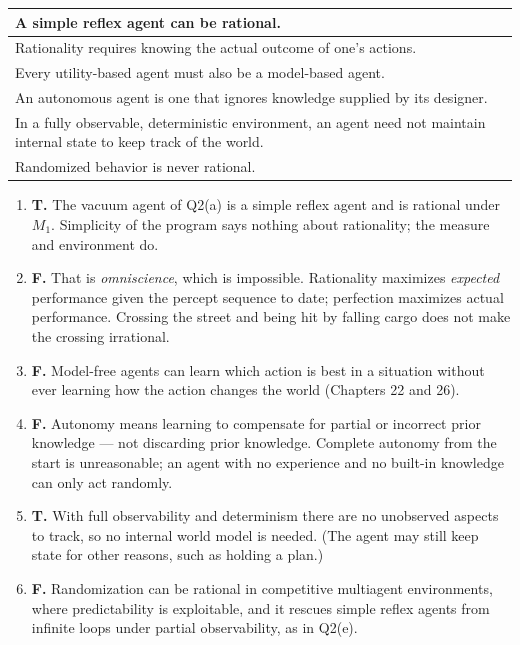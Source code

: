 \begin{center}
\renewcommand{\arraystretch}{1.9}
\begin{tabular}{p{13.2cm}|c}
\toprule
A simple reflex agent can be rational. & \A{T} \\
\hline
Rationality requires knowing the actual outcome of one's actions. & \A{F} \\
\hline
Every utility-based agent must also be a model-based agent. & \A{F} \\
\hline
An autonomous agent is one that ignores knowledge supplied by its designer. & \A{F} \\
\hline
In a fully observable, deterministic environment, an agent need not maintain internal state to keep track of the world. & \A{T} \\
\hline
Randomized behavior is never rational. & \A{F} \\
\bottomrule
\end{tabular}
\end{center}

\begin{sol}
\begin{enumerate}[label=\arabic*.,leftmargin=1.6em]
\item \textbf{T.} The vacuum agent of Q2(a) is a simple reflex agent and is rational under
$M_1$. Simplicity of the program says nothing about rationality; the measure and environment do.
\item \textbf{F.} That is \emph{omniscience}, which is impossible. Rationality maximizes
\emph{expected} performance given the percept sequence to date; perfection maximizes actual
performance. Crossing the street and being hit by falling cargo does not make the crossing
irrational.
\item \textbf{F.} Model-free agents can learn which action is best in a situation without ever
learning how the action changes the world (Chapters 22 and 26).
\item \textbf{F.} Autonomy means learning to compensate for partial or incorrect prior
knowledge --- not discarding prior knowledge. Complete autonomy from the start is unreasonable;
an agent with no experience and no built-in knowledge can only act randomly.
\item \textbf{T.} With full observability and determinism there are no unobserved aspects to
track, so no internal world model is needed. (The agent may still keep state for other reasons,
such as holding a plan.)
\item \textbf{F.} Randomization can be rational in competitive multiagent environments, where
predictability is exploitable, and it rescues simple reflex agents from infinite loops under
partial observability, as in Q2(e).
\end{enumerate}
\end{sol}


